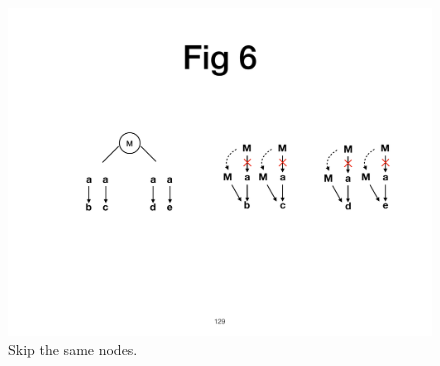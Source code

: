 
\begin{figure}[!htbp]
\centering
      \centering\includegraphics[width=\linewidth]{figures/ss-129.pdf}
\caption{\small Skip the same nodes.}
\label{fig:skip}
\end{figure}

